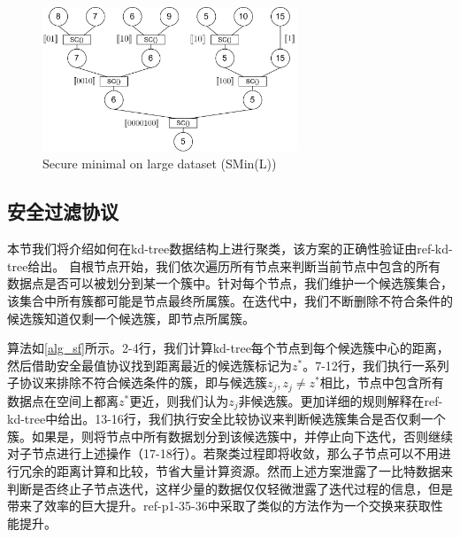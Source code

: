 \begin{figure}[htbp]
    \centering
    \includegraphics[width=3in]{img/fig1.png}%
    \caption{Secure minimal on large dataset (SMin(L))}
    \label{sminl}
\end{figure}

\subsection{安全过滤协议}
本节我们将介绍如何在kd-tree数据结构上进行聚类，该方案的正确性验证由ref-kd-tree给出。
自根节点开始，我们依次遍历所有节点来判断当前节点中包含的所有数据点是否可以被划分到某一个簇中。针对每个节点，我们维护一个候选簇集合，该集合中所有簇都可能是节点最终所属簇。在迭代中，我们不断删除不符合条件的候选簇知道仅剩一个候选簇，即节点所属簇。

算法如\ref{alg_sf}所示。2-4行，我们计算kd-tree每个节点到每个候选簇中心的距离，然后借助安全最值协议找到距离最近的候选簇标记为$z^*$。7-12行，我们执行一系列子协议来排除不符合候选条件的簇，即与候选簇$z_j,z_j\neq z^*$相比，节点中包含所有数据点在空间上都离$z^*$更近，则我们认为$z_j$非候选簇。更加详细的规则解释在ref-kd-tree中给出。13-16行，我们执行安全比较协议来判断候选簇集合是否仅剩一个簇。如果是，则将节点中所有数据划分到该候选簇中，并停止向下迭代，否则继续对子节点进行上述操作（17-18行）。若聚类过程即将收敛，那么子节点可以不用进行冗余的距离计算和比较，节省大量计算资源。然而上述方案泄露了一比特数据来判断是否终止子节点迭代，这样少量的数据仅仅轻微泄露了迭代过程的信息，但是带来了效率的巨大提升。ref-p1-35-36中采取了类似的方法作为一个交换来获取性能提升。

